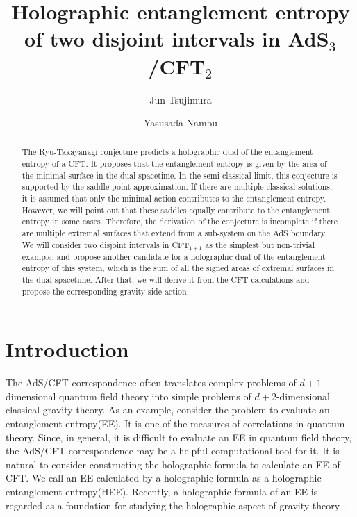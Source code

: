 \documentclass[%
 reprint,
 amsmath,amssymb,
 aps,
]{revtex4-2}
\begin{document}
\title{Holographic entanglement entropy of two disjoint intervals in AdS$_3$/CFT$_2$}
\author{Jun Tsujimura}
\author{Yasusada Nambu}


\begin{abstract}
    The Ryu-Takayanagi conjecture predicts a holographic dual of the entanglement entropy of a CFT. It proposes that the entanglement entropy is given by the area of the minimal surface in the dual spacetime. In the semi-classical limit, this conjecture is supported by the saddle point approximation. If there are multiple classical solutions, it is assumed that only the minimal action contributes to the entanglement entropy. However, we will point out that these saddles equally contribute to the entanglement entropy in some cases. Therefore, the derivation of the conjecture is incomplete if there are multiple extremal surfaces that extend from a sub-system on the AdS boundary. We will consider two disjoint intervals in CFT$_{1+1}$ as the simplest but non-trivial example, and propose another candidate for a holographic dual of the entanglement entropy of this system, which is the sum of all the signed areas of extremal surfaces in the dual spacetime. After that, we will derive it from the CFT calculations and propose the corresponding gravity side action.
\end{abstract}
\maketitle


\section{\label{sec:level1}Introduction}


    The AdS/CFT correspondence \cite{Maldacena:1997re,Gubser:1998bc,Witten:1998qj} often translates complex problems of $d+1$-dimensional quantum field theory into simple problems of $d+2$-dimensional classical gravity theory. As an example, consider the problem to evaluate an entanglement entropy(EE). It is one of the measures of correlations in quantum theory. Since, in general, it is difficult to evaluate an EE in quantum field theory, the AdS/CFT correspondence may be a helpful computational tool for it. It is natural to consider constructing the holographic formula to calculate an EE of CFT. We call an EE calculated by a holographic formula as a holographic entanglement entropy(HEE). Recently, a holographic formula of an EE is regarded as a foundation for studying the holographic aspect of gravity theory \cite{Czech:2012bh,Swingle:2009bg,Pastawski:2015qua,Dong:2016eik}. 
\end{document}
